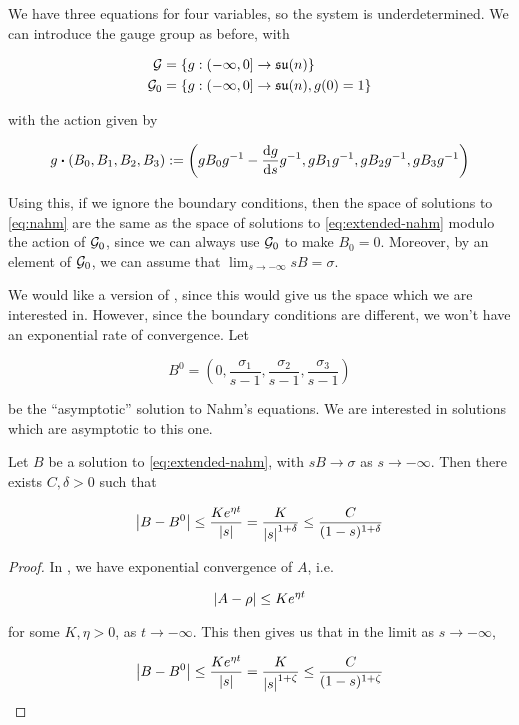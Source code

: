 \documentclass{report}
\newcommand{\su}{\mathfrak{su}}
\renewcommand{\sl}{\mathfrak{sl}}
\begin{document}
We have three equations for four variables, so the system is underdetermined. We can introduce the gauge group as before, with

\begin{align*}
    \mcG &= \left\{g : \Ioc{-\infty, 0} \to \su(n)\right\} \\
    \mcG_0 &= \left\{g : \Ioc{-\infty, 0} \to \su(n), g(0) = 1\right\}
\end{align*}

with the action given by

\[g \vdot (B_0, B_1, B_2, B_3) := \left(gB_0g^{-1} - \dv{g}{s}g^{-1}, gB_1g^{-1}, gB_2g^{-1}, gB_3g^{-1}\right)\]

Using this, if we ignore the boundary conditions, then the space of solutions to \cref{eq:nahm} are the same as the space of solutions to \cref{eq:extended-nahm} modulo the action of \(\mathcal{G}_0\), since we can always use \(\mathcal{G}_0\) to make \(B_0 = 0\). Moreover, by an element of \(\mathcal{G}_0\), we can assume that \(\lim_{s \to -\infty}sB = \sigma\). 

We would like a version of \cite[Lemma 3.4]{kronheimer_hyper-kahlerian_1990}, since this would give us the space which we are interested in. However, since the boundary conditions are different, we won't have an exponential rate of convergence. Let

\[B^0 = \left(0, \frac{\sigma_1}{s-1}, \frac{\sigma_2}{s-1}, \frac{\sigma_3}{s-1}\right)\]

be the ``asymptotic'' solution to Nahm's equations. We are interested in solutions which are asymptotic to this one. 

\begin{lemma}
    \label{lem:rate-of-convergence}
    Let \(B\) be a solution to \cref{eq:extended-nahm}, with \(sB \to \sigma\) as \(s \to -\infty\). Then there exists \(C, \delta > 0\) such that

    \[\abs{B - B^0} \le \frac{Ke^{\eta t}}{\abs{s}} = \frac{K}{\abs{s}^{1+\delta}} \le \frac{C}{(1-s)^{1+\delta}}\]
\end{lemma}

\begin{proof}
    In \cite[Proof of Theorem 1, p. 482]{kronheimer_instantons_1990}, we have exponential convergence of \(A\), i.e.
    
    \[\abs{A - \rho} \le Ke^{\eta t}\]
    
    for some \(K, \eta > 0\), as \(t \to -\infty\). This then gives us that in the limit as \(s \to -\infty\),
    
    \[\abs{B - B^0} \le \frac{Ke^{\eta t}}{\abs{s}} = \frac{K}{\abs{s}^{1+\zeta}} \le \frac{C}{(1-s)^{1+\zeta}}\]
\end{proof}
\end{document}
